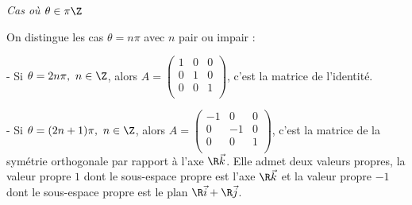 {\begin{enumerate}
{{\it Cas où $\theta\in\pi\Z$ }

On distingue les cas $\theta=n\pi$ avec $n$ pair ou impair :

- Si $\theta=2n\pi,\ n\in\Z$, alors $\displaystyle A=\begin{pmatrix}1&0&0 \\  0&1&0 \\ 0&0&1 \\ \end{pmatrix}$, c'est la matrice de l'identité.

- Si $\theta=(2n+1)\pi,\ n\in\Z$, alors $\displaystyle A=\begin{pmatrix}-1&0&0 \\  0&-1&0 \\ 0&0&1 \\ \end{pmatrix}$, c'est la matrice de la symétrie orthogonale par rapport à l'axe $\R\vec k$. Elle admet deux valeurs propres, la valeur propre $1$ dont le sous-espace propre est l'axe $\R\vec k$ et la valeur propre $-1$ dont le sous-espace propre est le plan $\R\vec i+\R\vec j$.}
\end{enumerate}
}